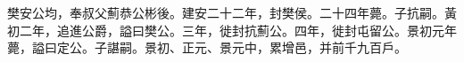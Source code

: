 
\begin{pinyinscope}
樊安公均，奉叔父薊恭公彬後。建安二十二年，封樊侯。二十四年薨。子抗嗣。黃初二年，追進公爵，謚曰樊公。三年，徙封抗薊公。四年，徙封屯留公。景初元年薨，謚曰定公。子諶嗣。景初、正元、景元中，累增邑，并前千九百戶。


\end{pinyinscope}